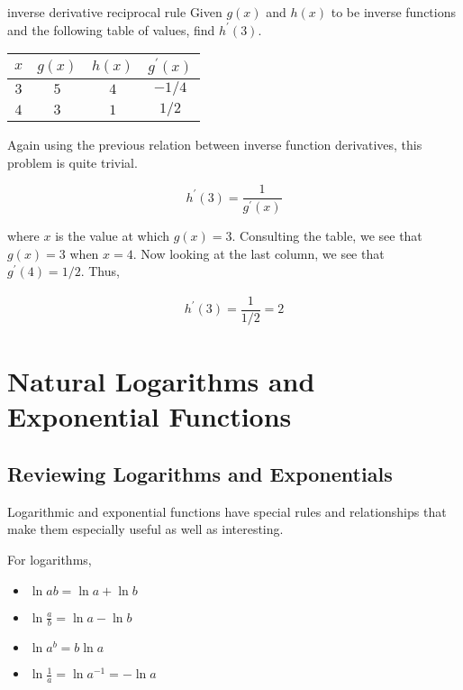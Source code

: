 \begin{example}{inverse derivative reciprocal rule}
    Given  \( g \left( x \right) \) and \( h \left( x \right) \) to be inverse functions and the following table of values, find \( h^\prime \left( 3 \right) \).
    
    \begin{center}
    \begin{tabular}{c|c|c|c}
        \( x \) & \( g \left( x \right) \) & \( h \left( x \right) \) & \( g^\prime \left( x \right) \) \\
        \hline
        \( 3 \) & \( 5 \) & \( 4 \) & \( -1/4 \) \\
        \( 4 \) & \( 3 \) & \( 1 \) & \( 1/2 \)
    \end{tabular}
    \end{center}
    
    Again using the previous relation between inverse function derivatives, this problem is quite trivial.
    
    \[ h^\prime \left( 3 \right) = \dfrac{1}{g^\prime \left( x \right)} \]
    
    where \( x \) is the value at which \( g \left( x \right) = 3 \). Consulting the table, we see that \( g \left( x \right) = 3 \) when \( x = 4 \). Now looking at the last column, we see that \( g^\prime \left( 4 \right) = 1/2 \). Thus,
    
    \begin{align}
        h^\prime \left( 3 \right) = \dfrac{1}{1/2} = 2
    \end{align}
\end{example}

\section{Natural Logarithms and Exponential Functions}

\subsection{Reviewing Logarithms and Exponentials}

Logarithmic and exponential functions have special rules and relationships that make them especially useful as well as interesting.

For logarithms,

\begin{multicols}{2}
    \begin{itemize}
        \item \( \ln{ab} = \ln{a} + \ln{b} \)
        \item \( \ln{\frac{a}{b}} = \ln{a} - \ln{b} \)
        \item \( \ln{a^b} = b \ln{a} \)
        \item \( \ln{\frac{1}{a}} = \ln{a^{-1}} = -\ln{a} \)
    \end{itemize}
\end{multicols}

